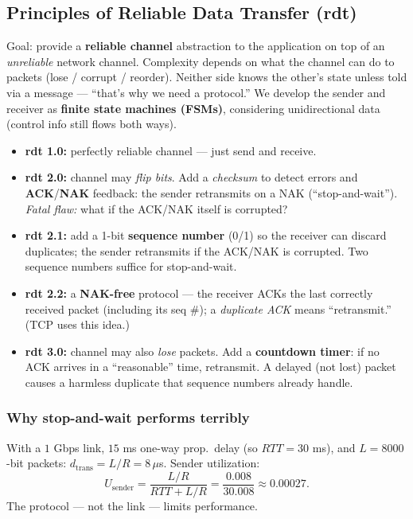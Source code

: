 \documentclass[hidelinks]{article}
\begin{document}
\subsection{Principles of Reliable Data Transfer (rdt)}

Goal: provide a \textbf{reliable channel} abstraction to the application on
top of an \emph{unreliable} network channel. Complexity depends on what the
channel can do to packets (lose / corrupt / reorder). Neither side knows the
other's state unless told via a message --- ``that's why we need a protocol.''
We develop the sender and receiver as \textbf{finite state machines (FSMs)},
considering unidirectional data (control info still flows both ways).

\begin{itemize}
    \item \textbf{rdt 1.0:} perfectly reliable channel --- just send and
    receive.
    \item \textbf{rdt 2.0:} channel may \emph{flip bits}. Add a
    \emph{checksum} to detect errors and \textbf{ACK}/\textbf{NAK} feedback:
    the sender retransmits on a NAK (``stop-and-wait''). \emph{Fatal flaw:}
    what if the ACK/NAK itself is corrupted?
    \item \textbf{rdt 2.1:} add a 1-bit \textbf{sequence number} (0/1) so the
    receiver can discard duplicates; the sender retransmits if the ACK/NAK is
    corrupted. Two sequence numbers suffice for stop-and-wait.
    \item \textbf{rdt 2.2:} a \textbf{NAK-free} protocol --- the receiver
    ACKs the last correctly received packet (including its seq \#); a
    \emph{duplicate ACK} means ``retransmit.'' (TCP uses this idea.)
    \item \textbf{rdt 3.0:} channel may also \emph{lose} packets. Add a
    \textbf{countdown timer}: if no ACK arrives in a ``reasonable'' time,
    retransmit. A delayed (not lost) packet causes a harmless duplicate that
    sequence numbers already handle.
\end{itemize}

\subsubsection{Why stop-and-wait performs terribly}
With a $1$ Gbps link, $15$ ms one-way prop.\ delay (so $RTT = 30$ ms), and
$L = 8000$-bit packets: $d_{\text{trans}} = L/R = 8\,\mu$s. Sender utilization:
\[
    U_{\text{sender}} = \frac{L/R}{RTT + L/R}
    = \frac{0.008}{30.008} \approx 0.00027.
\]
The protocol --- not the link --- limits performance.
\end{document}
